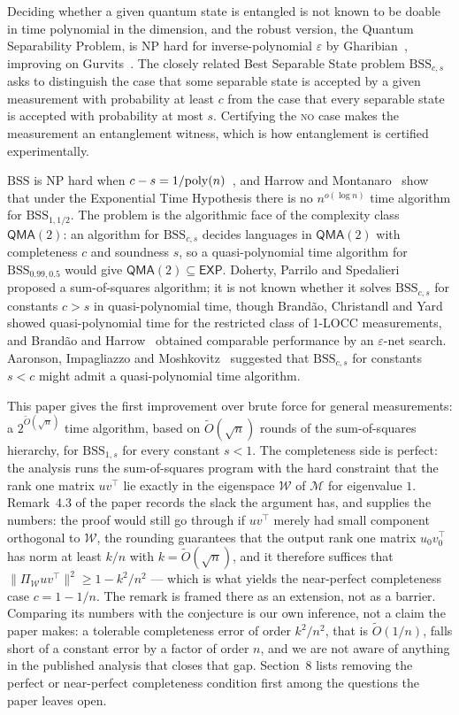 \documentclass{aicr-conjecture}
\newcommand{\BSS}{\mathrm{BSS}}
\newcommand{\tO}{\tilde{O}}
\newcommand{\QMA}{\mathsf{QMA}}
\newcommand{\EXP}{\mathsf{EXP}}
\begin{document}
Deciding whether a given quantum state is entangled is not known to be
doable in time polynomial in the dimension, and the robust version, the
Quantum Separability Problem, is NP hard for inverse-polynomial
$\varepsilon$ by Gharibian~\cite{Gha10}, improving on
Gurvits~\cite{Gur03}. The closely related Best Separable State problem
$\BSS_{c,s}$ asks to distinguish the case that some separable state is
accepted by a given measurement with probability at least $c$ from the
case that every separable state is accepted with probability at most
$s$. Certifying the \textsc{no} case makes the measurement an
entanglement witness, which is how entanglement is certified
experimentally.

$\BSS$ is NP hard when $c - s = 1/\mathrm{poly}(n)$~\cite{BT09,Gur03}, and
Harrow and Montanaro~\cite{HM13} show that under the Exponential Time
Hypothesis there is no $n^{o(\log n)}$ time algorithm for
$\BSS_{1,1/2}$. The problem is the algorithmic face of the complexity
class $\QMA(2)$: an algorithm for $\BSS_{c,s}$ decides languages in
$\QMA(2)$ with completeness $c$ and soundness $s$, so a
quasi-polynomial time algorithm for $\BSS_{0.99,0.5}$ would give
$\QMA(2) \subseteq \EXP$. Doherty, Parrilo and
Spedalieri~\cite{DPS04} proposed a sum-of-squares algorithm; it is not
known whether it solves $\BSS_{c,s}$ for constants $c > s$ in
quasi-polynomial time, though Brand\~{a}o, Christandl and
Yard~\cite{BaCY11} showed quasi-polynomial time for the restricted class
of 1-LOCC measurements, and Brand\~{a}o and Harrow~\cite{BH15} obtained
comparable performance by an $\varepsilon$-net search. Aaronson,
Impagliazzo and Moshkovitz~\cite{AIM14} suggested that $\BSS_{c,s}$ for
constants $s < c$ might admit a quasi-polynomial time algorithm.

This paper gives the first improvement over brute force for general
measurements: a $2^{\tO(\sqrt{n})}$ time algorithm, based on
$\tO(\sqrt{n})$ rounds of the sum-of-squares hierarchy, for
$\BSS_{1,s}$ for every constant $s < 1$. The completeness side is
perfect: the analysis runs the sum-of-squares program with the hard
constraint that the rank one matrix $uv^{\top}$ lie exactly in the
eigenspace $\mathcal{W}$ of $\mathcal{M}$ for eigenvalue $1$. Remark~4.3
of the paper records the slack the argument has, and supplies the
numbers: the proof would still go through if $uv^{\top}$ merely had
small component orthogonal to $\mathcal{W}$, the rounding guarantees
that the output rank one matrix $u_{0} v_{0}^{\top}$ has norm at least
$k/n$ with $k = \tO(\sqrt{n})$, and it therefore suffices that
$\|\Pi_{\mathcal{W}} uv^{\top}\|^{2} \ge 1 - k^{2}/n^{2}$ --- which is
what yields the near-perfect completeness case $c = 1 - 1/n$. The
remark is framed there as an extension, not as a barrier. Comparing its
numbers with the conjecture is our own inference, not a claim the paper
makes: a tolerable completeness error of order $k^{2}/n^{2}$, that is
$\tO(1/n)$, falls short of a constant error by a factor of order $n$,
and we are not aware of anything in the published analysis that closes
that gap. Section~8 lists removing the perfect or near-perfect
completeness condition first among the questions the paper leaves open.
\end{document}
